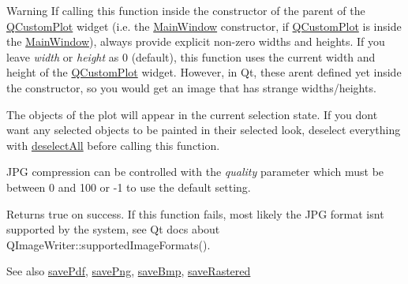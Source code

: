 \begin{DoxyWarning}{Warning}
If calling this function inside the constructor of the parent of the \hyperlink{classQCustomPlot}{Q\+Custom\+Plot} widget (i.\+e. the \hyperlink{classMainWindow}{Main\+Window} constructor, if \hyperlink{classQCustomPlot}{Q\+Custom\+Plot} is inside the \hyperlink{classMainWindow}{Main\+Window}), always provide explicit non-\/zero widths and heights. If you leave {\itshape width} or {\itshape height} as 0 (default), this function uses the current width and height of the \hyperlink{classQCustomPlot}{Q\+Custom\+Plot} widget. However, in Qt, these aren\textquotesingle{}t defined yet inside the constructor, so you would get an image that has strange widths/heights.
\end{DoxyWarning}
The objects of the plot will appear in the current selection state. If you don\textquotesingle{}t want any selected objects to be painted in their selected look, deselect everything with \hyperlink{classQCustomPlot_a9d4808ab925b003054085246c92a257c}{deselect\+All} before calling this function.

J\+PG compression can be controlled with the {\itshape quality} parameter which must be between 0 and 100 or -\/1 to use the default setting.

Returns true on success. If this function fails, most likely the J\+PG format isn\textquotesingle{}t supported by the system, see Qt docs about Q\+Image\+Writer\+::supported\+Image\+Formats().

\begin{DoxySeeAlso}{See also}
\hyperlink{classQCustomPlot_a632da44c6d94ea8b271eb483b08b5114}{save\+Pdf}, \hyperlink{classQCustomPlot_a7636261aff1f6d25c9da749ece3fc8b8}{save\+Png}, \hyperlink{classQCustomPlot_a6629d9e8e6da4bf18055ee0257fdce9a}{save\+Bmp}, \hyperlink{classQCustomPlot_ab528b84cf92baabe29b1d0ef2f77c93e}{save\+Rastered} 
\end{DoxySeeAlso}
